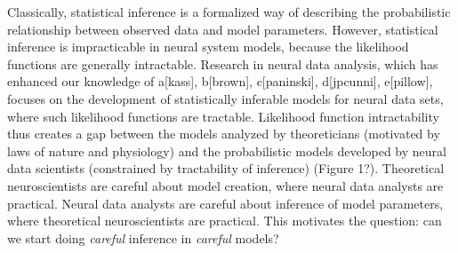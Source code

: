 \documentclass[11pt]{article}
\begin{document}

Classically, statistical inference is a formalized way of describing the probabilistic relationship between observed data and model parameters.  However, statistical inference is impracticable in neural system models, because the likelihood functions are generally intractable.  Research in neural data analysis, which has enhanced our knowledge of a[kass], b[brown], c[paninski], d[jpcunni], e[pillow], focuses on the development of statistically inferable models for neural data sets, where such likelihood functions are tractable. Likelihood function intractability thus creates a gap between the models analyzed by theoreticians (motivated by laws of nature and physiology) and the probabilistic models developed by neural data scientists (constrained by tractability of inference) (Figure 1?).   Theoretical neuroscientists are careful about model creation, where neural data analysts are practical.  Neural data analysts are careful about inference of model parameters, where theoretical neuroscientists are practical.  This motivates the question: can we start doing \emph{careful} inference in \emph{careful} models? \\
\end{document}
